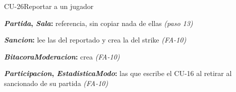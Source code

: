\begin{fichacu}{CU-26}{Reportar a un jugador}
{\begin{cudatos}
      \item \textbf{\textit{Partida}, \textit{Sala}:} referencia, sin copiar nada de ellas \textit{(paso 13)}
      \item \textbf{\textit{Sancion}:} lee las del reportado y crea la del strike \textit{(\mbox{FA-10})}
      \item \textbf{\textit{BitacoraModeracion}:} crea \textit{(\mbox{FA-10})}
      \item \textbf{\textit{Participacion}, \textit{EstadisticaModo}:} las que escribe el \mbox{CU-16} al retirar al sancionado de su partida \textit{(\mbox{FA-10})}
    \end{cudatos}} \\ \hline
\end{fichacu}
\clearpage

